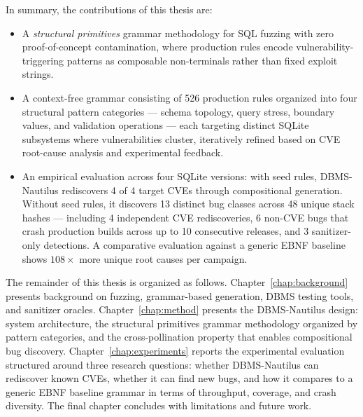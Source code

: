 In summary, the contributions of this thesis are:
\begin{itemize}
    \item A \textit{structural primitives} grammar methodology for SQL fuzzing with zero proof-of-concept contamination, where production rules encode vulnerability-triggering patterns as composable non-terminals rather than fixed exploit strings.
    \item A context-free grammar consisting of 526 production rules organized into four structural pattern categories --- schema topology, query stress, boundary values, and validation operations --- each targeting distinct SQLite subsystems where vulnerabilities cluster, iteratively refined based on CVE root-cause analysis and experimental feedback.
    \item An empirical evaluation across four SQLite versions: with seed rules, DBMS-Nautilus rediscovers 4 of 4 target CVEs through compositional generation. Without seed rules, it discovers 13 distinct bug classes across 48 unique stack hashes --- including 4 independent CVE rediscoveries, 6 non-CVE bugs that crash production builds across up to 10 consecutive releases, and 3 sanitizer-only detections. A comparative evaluation against a generic EBNF baseline shows $108\times$ more unique root causes per campaign.
\end{itemize}

The remainder of this thesis is organized as follows. Chapter~\ref{chap:background} presents background on fuzzing, grammar-based generation, DBMS testing tools, and sanitizer oracles. Chapter~\ref{chap:method} presents the DBMS-Nautilus design: system architecture, the structural primitives grammar methodology organized by pattern categories, and the cross-pollination property that enables compositional bug discovery. Chapter~\ref{chap:experiments} reports the experimental evaluation structured around three research questions: whether DBMS-Nautilus can rediscover known CVEs, whether it can find new bugs, and how it compares to a generic EBNF baseline grammar in terms of throughput, coverage, and crash diversity. The final chapter concludes with limitations and future work.
